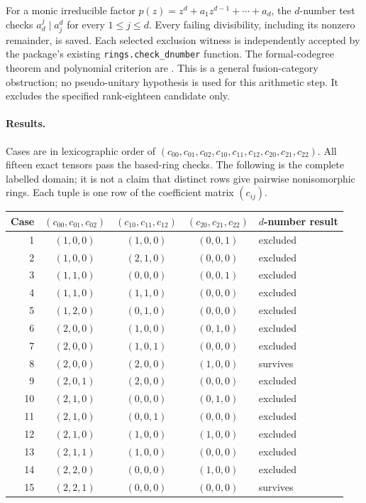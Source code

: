 \documentclass[11pt]{article}
\begin{document}
For a monic irreducible factor
$p(z)=z^d+a_1z^{d-1}+\cdots+a_d$, the $d$-number test checks
$a_d^j\mid a_j^d$ for every $1\leq j\leq d$.
Every failing divisibility, including its nonzero remainder, is saved.
Each selected exclusion witness is independently accepted by the
package's existing \texttt{rings.check\_dnumber} function. The
formal-codegree theorem and polynomial criterion are
\cite[Theorem 1.2 and Lemma 2.7(v)]{Ostrik}. This is a general fusion-category
obstruction; no pseudo-unitary hypothesis is used for this arithmetic
step. It excludes the specified rank-eighteen candidate only.

\paragraph{Results.}
Cases are in lexicographic order of
$(c_{00},c_{01},c_{02},c_{10},c_{11},c_{12},c_{20},c_{21},c_{22})$.
All fifteen exact tensors pass the based-ring checks. The following is
the complete labelled domain; it is not a claim that distinct rows
give pairwise nonisomorphic rings. Each tuple is one row of the
coefficient matrix $(c_{ij})$.
\begin{center}
\begin{tabular}{rcccl}\toprule
Case & $(c_{00},c_{01},c_{02})$ & $(c_{10},c_{11},c_{12})$
& $(c_{20},c_{21},c_{22})$ & $d$-number result\\\midrule
1  & $(1,0,0)$ & $(1,0,0)$ & $(0,0,1)$ & excluded\\
2  & $(1,0,0)$ & $(2,1,0)$ & $(0,0,0)$ & excluded\\
3  & $(1,1,0)$ & $(0,0,0)$ & $(0,0,1)$ & excluded\\
4  & $(1,1,0)$ & $(1,1,0)$ & $(0,0,0)$ & excluded\\
5  & $(1,2,0)$ & $(0,1,0)$ & $(0,0,0)$ & excluded\\
6  & $(2,0,0)$ & $(1,0,0)$ & $(0,1,0)$ & excluded\\
7  & $(2,0,0)$ & $(1,0,1)$ & $(0,0,0)$ & excluded\\
8  & $(2,0,0)$ & $(2,0,0)$ & $(1,0,0)$ & survives\\
9  & $(2,0,1)$ & $(2,0,0)$ & $(0,0,0)$ & excluded\\
10 & $(2,1,0)$ & $(0,0,0)$ & $(0,1,0)$ & excluded\\
11 & $(2,1,0)$ & $(0,0,1)$ & $(0,0,0)$ & excluded\\
12 & $(2,1,0)$ & $(1,0,0)$ & $(1,0,0)$ & excluded\\
13 & $(2,1,1)$ & $(1,0,0)$ & $(0,0,0)$ & excluded\\
14 & $(2,2,0)$ & $(0,0,0)$ & $(1,0,0)$ & excluded\\
15 & $(2,2,1)$ & $(0,0,0)$ & $(0,0,0)$ & survives\\\bottomrule
\end{tabular}
\end{center}
\end{document}
